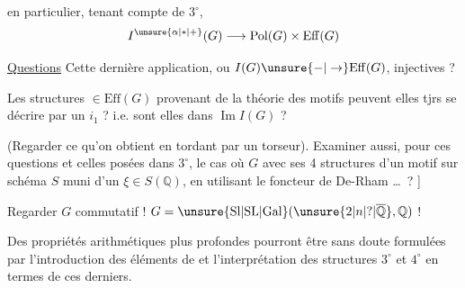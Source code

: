 
en particulier, tenant compte de $3^\circ$,
\[
I^{\unsure{\alpha|*|+}}(G)\longrightarrow \mathrm{Pol}(G)\times\mathrm{Eff}(G)
\]

\uline{Questions} Cette dernière application, ou $I(G)\unsure{-|\to}\mathrm{Eff}(G)$, injectives ?

Les structures $\in\mathrm{Eff}(G)$ provenant de la théorie des motifs peuvent elles tjrs se décrire par un $i_1$ ? i.e. sont elles dans $\operatorname{Im}I(G)$ ?

(Regarder ce qu'on obtient en tordant par un torseur). Examiner aussi, pour ces questions et celles posées dans $3^\circ$, le cas où $G$ avec ses 4 structures  d'un motif sur schéma  $S$ muni d'un $\xi\in S(\mathbb{Q})$, en utilisant le foncteur de De-Rham \ldots\ ? ]

Regarder $G$ commutatif ! $G=\unsure{\mathrm{Sl}|\mathrm{SL}|\mathrm{Gal}}(\unsure{2|n|?|\overline{\mathbb Q}},\mathbb{Q})$ !

Des propriétés arithmétiques plus profondes pourront être sans doute formulées par l'introduction des éléments de  et l'interprétation des structures $3^\circ$ et $4^\circ$ en termes de ces derniers.
